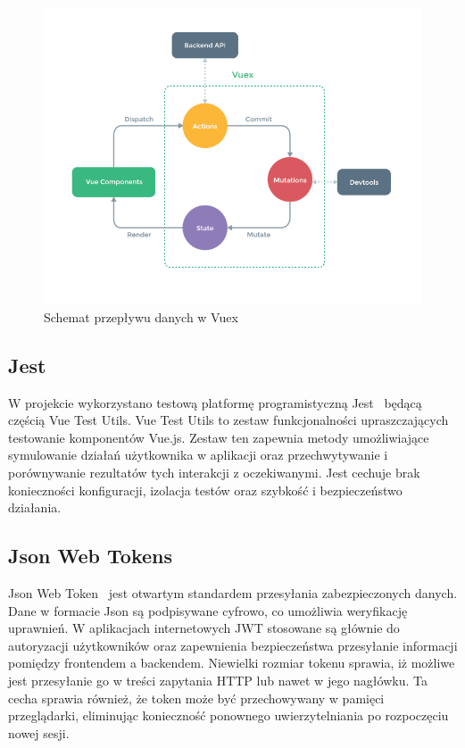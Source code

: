 \begin{figure}[t]
\centering\includegraphics[width=\textwidth]{figures/vuex}
\caption{Schemat przepływu danych w Vuex~\cite{vuex2}}\label{rys:vuex}
\end{figure}

\subsection{Jest}
W projekcie wykorzystano testową platformę programistyczną Jest~\cite{jest} będącą częścią Vue Test Utils. Vue Test Utils to zestaw funkcjonalności upraszczających testowanie komponentów Vue.js. Zestaw ten zapewnia metody umożliwiające symulowanie działań użytkownika w aplikacji oraz przechwytywanie i porównywanie rezultatów tych interakcji z oczekiwanymi. Jest cechuje brak konieczności konfiguracji, izolacja testów oraz szybkość i bezpieczeństwo działania.
\subsection{Json Web Tokens}
Json Web Token~\cite{jwt} jest otwartym standardem przesyłania zabezpieczonych danych. Dane w formacie Json są podpisywane cyfrowo, co umożliwia weryfikację uprawnień. W aplikacjach internetowych JWT stosowane są głównie do autoryzacji użytkowników oraz zapewnienia bezpieczeństwa przesyłanie informacji pomiędzy frontendem a backendem. Niewielki rozmiar tokenu sprawia, iż możliwe jest przesyłanie go w treści zapytania HTTP lub nawet w jego nagłówku. Ta cecha sprawia również, że token może być przechowywany w pamięci przeglądarki, eliminując konieczność ponownego uwierzytelniania po rozpoczęciu nowej sesji.
